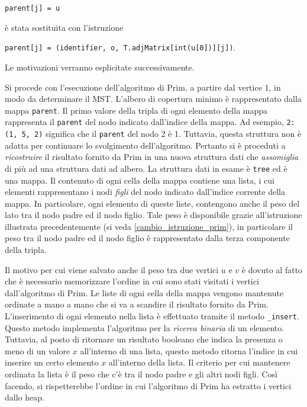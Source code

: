 \verb|parent[j] = u|

è stata sostituita con l'istruzione

\verb|parent[j] = (identifier, o, T.adjMatrix[int(u[0])][j])|. 

Le motivazioni verranno esplicitate successivamente.

Si procede con l'esecuzione dell'algoritmo di Prim, a partire dal vertice 1, in modo da 
determinare il MST. L'albero di copertura minimo è rappresentato dalla mappa 
\verb|parent|. Il primo valore della tripla di ogni elemento della mappa rappresenta 
il \verb|parent| del nodo indicato dall'indice della mappa. Ad esempio, 
\verb|2: (1, 5, 2)| significa che il \verb|parent| del nodo 2 è 1. Tuttavia, 
questa struttura non è adatta per continuare lo svolgimento dell'algoritmo. 
Pertanto si è proceduti a \textit{ricostruire} il risultato fornito da Prim in una nuova 
struttura dati che \textit{assomiglia} di più ad una struttura dati ad albero. La 
struttura dati in esame è \verb|tree| ed è una mappa. Il contenuto di ogni cella della 
mappa contiene una lista, i cui elementi rappresentano i nodi \textit{figli} del nodo 
indicato dall'indice corrente della mappa. In particolare, ogni elemento di queste 
liste, contengono anche il peso del lato tra il nodo padre ed il nodo figlio. Tale peso 
è disponibile grazie all'istruzione illustrata precedentemente (si veda 
\ref{cambio_istruzione_prim}), in particolare il peso tra il nodo padre ed il nodo figlio 
è rappresentato dalla terza componente della tripla.

Il motivo per cui viene salvato anche il peso tra due vertici $u$ e $v$ è dovuto al fatto che è 
necessario memorizzare l'ordine in cui sono stati visitati i vertici dall'algoritmo di Prim. 
Le liste di ogni cella della mappa vengono mantenute ordinate a mano a mano che si va 
a scandire il risultato fornito da Prim. L'inserimento di ogni elemento nella lista è 
effettuato tramite il metodo \verb|_insert|. Questo metodo implementa l'algoritmo per la 
\textit{ricerca binaria} di un elemento. Tuttavia, al posto di ritornare un risultato 
booleano che indica la presenza o meno di un valore $x$ all'interno di una lista, 
questo metodo ritorna l'indice in cui inserire un certo elemento $x$ all'interno della lista. 
Il criterio per cui mantenere ordinata la lista è il peso che c'è tra il nodo padre 
e gli altri nodi figli. Così facendo, si rispetterebbe l'ordine in cui l'algoritmo di Prim 
ha estratto i vertici dallo heap.

